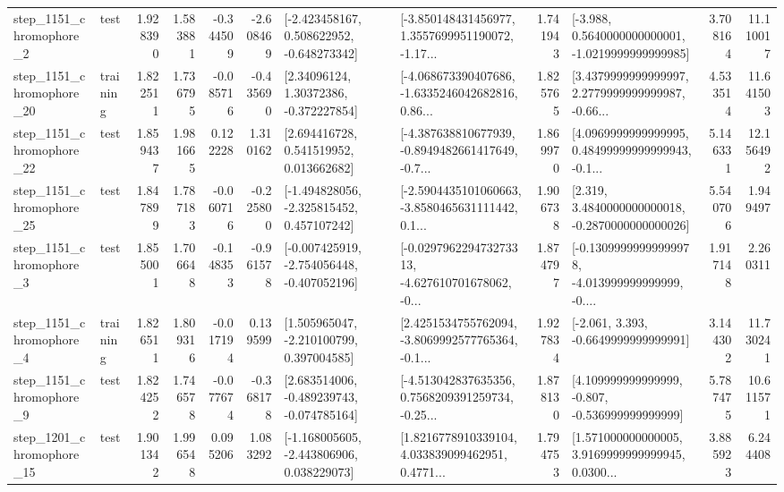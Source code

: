\begin{tabular}{llrrrrllrlrr}
  step\_1151\_chromophore\_2 &      test &      1.928390 &    1.583881 &     -0.344509 & -2.608469 &   [-2.423458167, 0.508622952, -0.648273342] &  [-3.850148431456977, 1.3557699951190072, -1.17... &       1.741943 &  [-3.988, 0.5640000000000001, -1.0219999999999985] &            3.708164 &         11.110017 \\
 step\_1151\_chromophore\_20 &  training &      1.822511 &    1.736795 &     -0.085716 & -0.435690 &      [2.34096124, 1.30372386, -0.372227854] &  [-4.068673390407686, -1.6335246042682816, 0.86... &       1.825765 &  [3.4379999999999997, 2.2779999999999987, -0.66... &            4.533514 &         11.641503 \\
 step\_1151\_chromophore\_22 &      test &      1.859437 &    1.981665 &      0.122228 &  1.310162 &     [2.694416728, 0.541519952, 0.013662682] &  [-4.387638810677939, -0.8949482661417649, -0.7... &       1.869970 &  [4.0969999999999995, 0.48499999999999943, -0.1... &            5.146331 &         12.156492 \\
 step\_1151\_chromophore\_25 &      test &      1.847899 &    1.787183 &     -0.060716 & -0.225800 &   [-1.494828056, -2.325815452, 0.457107242] &  [-2.5904435101060663, -3.8580465631111442, 0.1... &       1.906738 &   [2.319, 3.4840000000000018, -0.2870000000000026] &            5.540706 &          1.949497 \\
  step\_1151\_chromophore\_3 &      test &      1.855001 &    1.706648 &     -0.148353 & -0.961578 &  [-0.007425919, -2.754056448, -0.407052196] &  [-0.029796229473273313, -4.627610701678062, -0... &       1.874797 &  [-0.13099999999999978, -4.013999999999999, -0.... &            1.917148 &          2.260311 \\
  step\_1151\_chromophore\_4 &  training &      1.826511 &    1.809316 &     -0.017194 &  0.139599 &    [1.505965047, -2.210100799, 0.397004585] &  [2.4251534755762094, -3.8069992577765364, -0.1... &       1.927834 &               [-2.061, 3.393, -0.6649999999999991] &            3.144302 &         11.730241 \\
  step\_1151\_chromophore\_9 &      test &      1.824252 &    1.746578 &     -0.077674 & -0.368178 &   [2.683514006, -0.489239743, -0.074785164] &  [-4.513042837635356, 0.7568209391259734, -0.25... &       1.878130 &    [4.109999999999999, -0.807, -0.536999999999999] &            5.787475 &         10.611571 \\
 step\_1201\_chromophore\_15 &      test &      1.901342 &    1.996548 &      0.095206 &  1.083292 &   [-1.168005605, -2.443806906, 0.038229073] &  [1.8216778910339104, 4.033839099462951, 0.4771... &       1.794753 &  [1.571000000000005, 3.9169999999999945, 0.0300... &            3.885923 &          6.244408 \\

\end{tabular}
